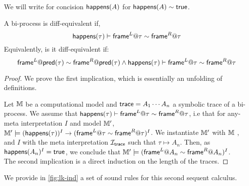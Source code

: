 We will write for concision $\textsf{happens}(A)$ for $\textsf{happens}(A) \sim \textsf{true}$.
\begin{lemma}
  A bi-process is diff-equivalent if,
  \[ \textsf{happens}(\tau)\vdash  \textsf{frame}^L@\tau \sim \textsf{frame}^R@\tau\]
  Equivalently, is it diff-equivalent if:
  \[\textsf{frame}^L@\textsf{pred}(\tau) \sim \textsf{frame}^R@\textsf{pred}(\tau) \wedge \textsf{happens}(\tau) \vdash \textsf{frame}^L@\tau \sim \textsf{frame}^R@\tau\]
\end{lemma}
\begin{proof}We prove the first implication, which is essentially an unfolding of definitions.

  Let $\mathbb{M}$ be a computational model and $\textsf{trace} = A_1 \cdots A_n$ a symbolic trace of a bi-process.
  We assume that  $ \textsf{happens} (\tau)  \vdash \textsf{frame}^L@\tau \sim \textsf{frame}^R@\tau$, i.e that for any-meta interpretation $I$ and model $\mathbb{M}'$, $\mathbb{M}' \models (\textsf{happens}(\tau))^I \rightarrow (\textsf{frame}^L@\tau \sim \textsf{frame}^R@\tau)^I$. We instantiate $\mathbb{M}'$ with $\mathbb{M}$ , and $I$ with the meta interpretation $\mathcal{I}_{\textsf{trace}}$ such that $\tau \mapsto A_n$. Then, as $\textsf{happens}(A_n)^I = \textsf{true}$, we conclude that $\mathbb{M}' \models  (\textsf{frame}^L@A_n \sim \textsf{frame}^R@A_n)^I$.\\

  The second implication is a direct induction on the length of the traces.
  \end{proof}

We provide in \cref{fig:lk-ind} a set of sound rules for this second sequent calculus.

